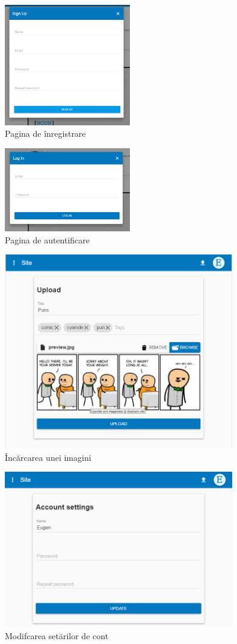 \begin{figure}[ht]
	\centering
	\includegraphics[width=5.5cm]{signup}
	\caption{Pagina de înregistrare}
\end{figure}

\begin{figure}[ht]
	\centering
	\includegraphics[width=5.5cm]{login}
	\caption{Pagina de autentificare}
\end{figure}

\begin{figure}[ht]
	\centering
	\includegraphics[width=10cm]{upload}
	\caption{Încărcarea unei imagini}
\end{figure}

\begin{figure}[ht]
	\centering
	\includegraphics[width=10cm]{account}
	\caption{Modifcarea setărilor de cont}
\end{figure}

\clearpage